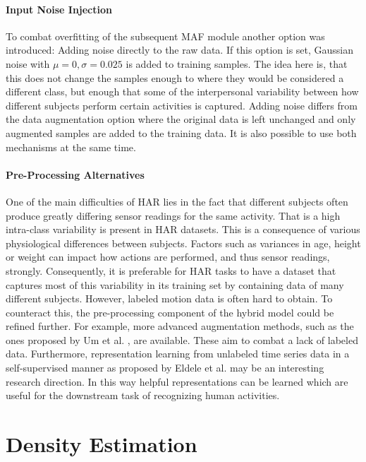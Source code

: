\documentclass[11pt,titlepage,oneside,openany]{book}
\begin{document}
\paragraph{Input Noise Injection}
To combat overfitting of the subsequent MAF module another option was introduced: Adding noise directly to the raw data. If this option is set, Gaussian noise with $\mu = 0, \sigma = 0.025$ is added to training samples. The idea here is, that this does not change the samples enough to where they would be considered a different class, but enough that some of the interpersonal variability between how different subjects perform certain activities is captured. Adding noise differs from the data augmentation option where the original data is left unchanged and only augmented samples are added to the training data. It is also possible to use both mechanisms at the same time.

\paragraph{Pre-Processing Alternatives}
One of the main difficulties of HAR lies in the fact that different subjects often produce greatly differing sensor readings for the same activity. That is a high intra-class variability is present in HAR datasets. This is a consequence of various physiological differences between subjects. Factors such as variances in age, height or weight can impact how actions are performed, and thus sensor readings, strongly. Consequently, it is preferable for HAR tasks to have a dataset that captures most of this variability in its training set by containing data of many different subjects. However, labeled motion data is often hard to obtain. To counteract this, the pre-processing component of the hybrid model could be refined further. For example, more advanced augmentation methods, such as the ones proposed by Um et al. \cite{um_data_2017}, are available. These aim to combat a lack of labeled data. Furthermore, representation learning from unlabeled time series data in a self-supervised manner as proposed by Eldele et al. \cite{eldele_time-series_2021} may be an interesting research direction. In this way helpful representations can be learned which are useful for the downstream task of recognizing human activities.

\section{Density Estimation}
\label{sec:densest}
\end{document}
